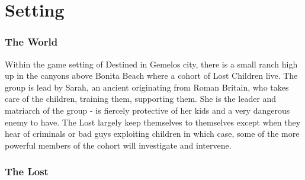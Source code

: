 \documentclass[letterpaper,serif]{rpg-module}
\begin{document}
\part{Setting}
\label{setting}

\section{The World}

Within the game setting of Destined in Gemelos city, there is a small ranch high up in the canyons above Bonita Beach where a cohort of Lost Children live. The group is lead by Sarah, an ancient originating from Roman Britain, who takes care of the children, training them, supporting them. She is the leader and matriarch of the group - is fiercely protective of her kids and a very dangerous enemy to have. The Lost largely keep themselves to themselves except when they hear of criminals or bad guys exploiting children in which case, some of the more powerful members of the cohort will investigate and intervene. 

\section{The Lost}
\label{npcs}
\end{document}
